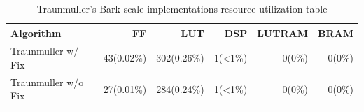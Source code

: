 \begin{table}[H]
    \centering
\begin{tabular}{ !{\color{ytblborder}\vrule}l!{\color{ytblborder}\vrule}rrrrr| } 
    \hline

    \hline
     \color{white}\bf{Algorithm} 
    & \color{white}\bf{FF} 
    & \color{white}\bf{LUT} 
    & \color{white}\bf{DSP} 
    & \color{white}\bf{LUTRAM} 
    & \color{white}\bf{BRAM} \\
    \hline

    \hline
     Traunmuller w/ Fix   & 43(0.02\%) & 302(0.26\%) & 1(<1\%) & 0(0\%) & 0(0\%)  \\
    \hline
    
    \hline
     Traunmuller w/o Fix      & 27(0.01\%) & 284(0.24\%) & 1(<1\%) & 0(0\%)  & 0(0\%)    \\
    \hline

    \hline
\end{tabular}
\caption{Traunmuller's Bark scale implementations resource utilization table}
\label{tbl:Bark_resource_util}
\end{table}


